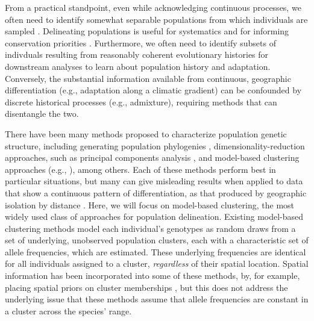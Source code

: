 \documentclass[10pt,letterpaper]{article}
\begin{document}
From a practical standpoint, even while acknowledging continuous
processes, we often need to identify somewhat separable populations 
from which individuals are sampled \cite{wright1949genetical}.
Delineating populations is useful for systematics and for
informing conservation priorities \cite{Moritz1994,Waples_1998,Moritz_etal_2002}.
Furthermore, we often need to identify subsets of indivduals resulting from reasonably coherent
evolutionary histories for downstream analyses to learn about population history and adaptation.
Conversely,
the substantial information available from continuous, geographic differentiation
(e.g., adaptation along a climatic gradient)
can be confounded by discrete historical processes (e.g., admixture),
requiring methods that can disentangle the two.

There have been many methods proposed to characterize population
genetic structure,
including generating population phylogenies \cite{CavalliSforza1975, treemix},
dimensionality-reduction approaches, 
such as principal components analysis 
\cite{meirmans2009genodive,menozzi1978synthetic,novembre_interpreting_2008, price2006eigenstrat},
and model-based clustering approaches 
(e.g., \cite{STRUCTURE, falush2003, hubisz2009,ADMIXTURE, 
FINESTRUCTURE, fastStructure, huelsenbeck2007inference, 
Corander2003,TESS,geneland}), among others.
Each of these methods perform best in particular situations,
but many can give misleading results when applied to data 
that show a continuous pattern of differentiation,
as that produced by geographic isolation by distance 
\cite{Wright1943, novembre_interpreting_2008, Frantz2009}.
Here, we will focus on model-based clustering, the most widely used class of approaches for population delineation.
Existing model-based clustering methods model each individual's genotypes 
as random draws from a set of underlying, unobserved population clusters, 
each with a characteristic set of allele frequencies, which are estimated. 
These underlying frequencies are identical 
for all individuals assigned to a cluster, 
\emph{regardless} of their spatial location. 
Spatial information has been incorporated into some of these methods, 
by, for example, placing spatial priors on cluster memberships \cite{geneland,TESS}, 
but this does not address the underlying issue that 
these methods assume that allele frequencies 
are constant in a cluster across the species' range.  
\end{document}
